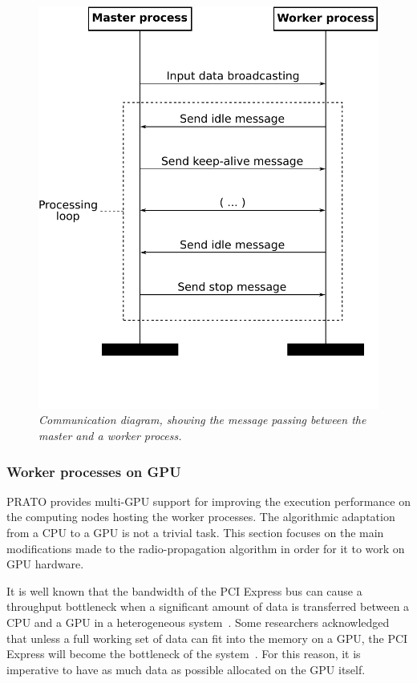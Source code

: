 \begin{figure}
\begin{minipage}[t]{0.49\textwidth}
\includegraphics[width=1\columnwidth]{04-framework_design_and_implementation/img/master_worker_communication_diagram}

\caption{\textit{\emph{Communication diagram, showing the message passing between
the master and a worker process.\label{fig:04-Master_worker_communication}}}}
%
\end{minipage}
\end{figure}



\subsubsection{Worker processes on GPU \label{sub:04-GPU_worker_implementation}}

PRATO provides multi-GPU support for improving the execution performance
on the computing nodes hosting the worker processes. The algorithmic
adaptation from a CPU to a GPU is not a trivial task. This section
focuses on the main modifications made to the radio-propagation algorithm
in order for it to work on GPU hardware.

It is well known that the bandwidth of the PCI Express bus can cause
a throughput bottleneck when a significant amount of data is transferred
between a CPU and a GPU in a heterogeneous system~\cite{Gregg-Where_is_the_data:2011}.
Some researchers acknowledged that unless a full working set of data
can fit into the memory on a GPU, the PCI Express will become the
bottleneck of the system~\cite{Owens-GPU_computing:2008,Schaa-Exploring_the_multiple_GPU_design_space:2009}.
For this reason, it is imperative to have as much data as possible
allocated on the GPU itself.

